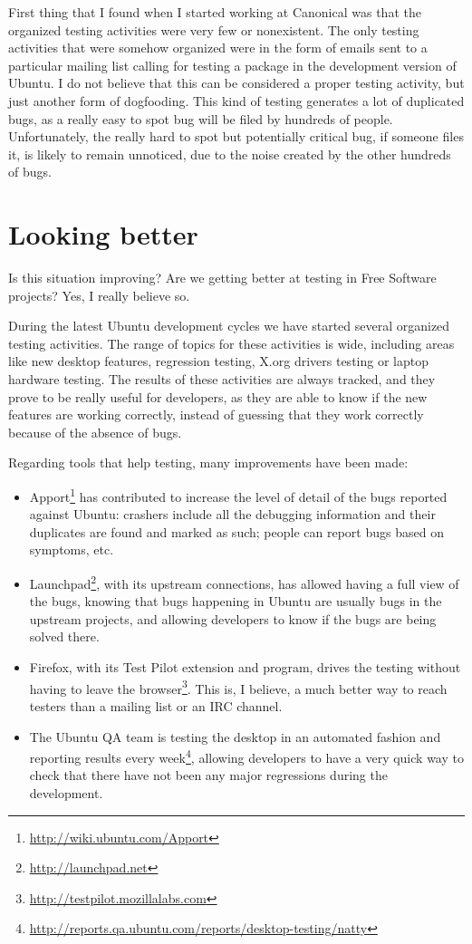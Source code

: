 First thing that I found when I started working at Canonical was that the
organized testing activities were very few or nonexistent. The only testing
activities that were somehow organized were in the form of emails sent to a
particular mailing list calling for testing a package in the development version
of Ubuntu. I do not believe that this can be considered a proper testing
activity, but just another form of dogfooding. This kind of testing generates a
lot of duplicated bugs, as a really easy to spot bug will be filed by hundreds
of people. Unfortunately, the really hard to spot but potentially critical bug,
if someone files it, is likely to remain unnoticed, due to the noise created by
the other hundreds of bugs.

\section*{Looking better}

Is this situation improving? Are we getting better at testing in Free Software projects?
Yes, I really believe so.

During the latest Ubuntu development cycles we have started several organized
testing activities. The range of topics for these activities is wide, including
areas like new desktop features, regression testing, X.org drivers testing or
laptop hardware testing. The results of these activities are always tracked, and
they prove to be really useful for developers, as they are able to know if the
new features are working correctly, instead of guessing that they work correctly
because of the absence of bugs.

Regarding tools that help testing, many improvements have been made:
\begin{itemize}
 \item Apport\footnote{\url{http://wiki.ubuntu.com/Apport}} has contributed to
increase the level of detail of the bugs reported against Ubuntu: crashers
include all the debugging information and their duplicates are found and marked
as such; people can report bugs based on symptoms, etc.
 \item Launchpad\footnote{\url{http://launchpad.net}}, with its upstream
connections, has allowed having a full view of the bugs, knowing that bugs
happening in Ubuntu are usually bugs in the upstream projects, and allowing
developers to know if the bugs are being solved there. 
 \item Firefox, with its Test Pilot extension and program, drives the testing
without having to leave the
browser\footnote{\url{http://testpilot.mozillalabs.com}}. This is, I believe, a
much better way to reach testers than a mailing list or an IRC channel.
 \item The Ubuntu QA team is testing the desktop in an automated fashion and
reporting results every
week\footnote{\url{http://reports.qa.ubuntu.com/reports/desktop-testing/natty}},
allowing developers to have a very quick way to check that there have not been
any major regressions during the development.
\end{itemize}

